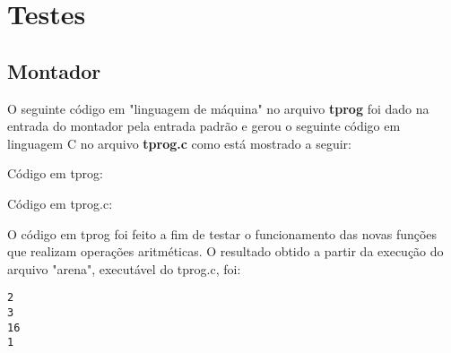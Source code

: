 \documentclass[12pt, a4paper]{article}
\begin{document}
\section{Testes}
\subsection{Montador}
O seguinte código em "linguagem de máquina" no arquivo \textbf{tprog} foi dado na entrada do montador pela entrada padrão e gerou o seguinte código em linguagem C no arquivo \textbf{tprog.c} como está mostrado a seguir:
\begin{center}
Código em tprog:

\clearpage
Código em tprog.c:

\end{center}
O código em tprog foi feito a fim de testar o funcionamento das novas funções que realizam operações aritméticas. O resultado obtido a partir da execução do arquivo "arena", executável do tprog.c, foi:
\begin{lstlisting}
2
3
16
1
\end{lstlisting}
\clearpage
\end{document}
